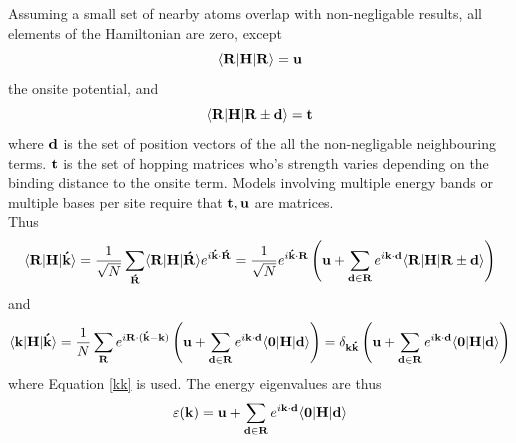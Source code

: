 \documentclass[a4paper, 12pt]{article}
\begin{document}
		Assuming a small set of nearby atoms overlap with non-negligable results, all elements of the Hamiltonian are zero, except
		\begin{equation}\label{u}
			\langle{\bf R}|{\bf H}|{\bf R}\rangle = \bf u
		\end{equation}
		the onsite potential, and 
		\begin{equation}\label{t}
			\langle{\bf R}|{\bf H}|{\bf R}\pm {\bf d}\rangle = \bf t
		\end{equation}
		where $\bf d$ is the set of position vectors of the all the non-negligable neighbouring terms. $\bf t$ is the set of hopping matrices who's strength varies depending on the binding distance to the onsite term. Models involving multiple energy bands or multiple bases per site require that $\bf t, u$ are matrices. 
		\\[2mm]Thus
		\begin{equation}
			\langle{\bf R}|{\bf H}|{\bf \acute{k}}\rangle = \frac{1}{\sqrt{N}}\sum_{\bf \acute{R}}\langle{\bf {R}}|{\bf H}|{\bf \acute{R}}\rangle e^{i\bf \acute{k}\cdot \acute{R}}= \frac{1}{\sqrt{N}}e^{i\bf \acute{k}\cdot R}\left({\bf u}+\sum_{{\bf d }\in {\bf R}}e^{i{\bf k \cdot d}}\langle{\bf R}|{\bf H}|{\bf R}\pm {\bf d}\rangle\right)
		\end{equation}
		and
		\begin{equation}\label{sumtb}
			\langle{\bf k}|{\bf H}|{\bf \acute{k}}\rangle = \frac{1}{N}\sum_{\bf R} e^{i\bf R\cdot (\acute{k}-k)}\left( {\bf u} + \sum_{{\bf d}\in {\bf R}}e^{i{\bf k \cdot d}}\langle\bf 0|H|d\rangle\right) = \delta_{\bf k \acute{k}}\left( {\bf u} + \sum_{{\bf d}\in {\bf R}}e^{i{\bf k \cdot d}}\langle\bf 0|H|d\rangle\right)
		\end{equation}
		where Equation \eqref{kk} is used.
		The energy eigenvalues are thus
		\begin{equation}
			\varepsilon({\bf k})= {\bf u} + \sum_{{\bf d}\in {\bf R}}e^{i{\bf k \cdot d}}\langle\bf 0|H|d\rangle
			\label{tight}
		\end{equation}
\end{document}
